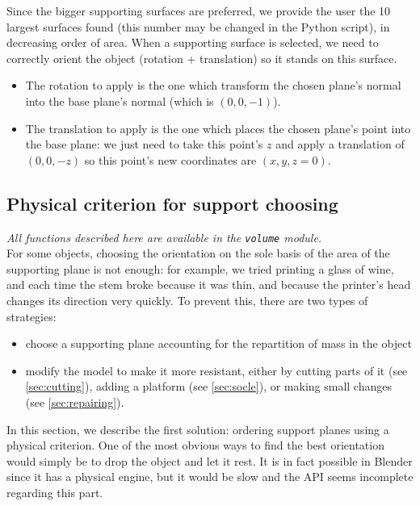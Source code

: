 \documentclass{report}
\begin{document}
Since the bigger supporting surfaces are preferred, we provide the user the 10 largest surfaces found (this number may be changed in the Python script), in decreasing order of area. When a supporting surface is selected, we need to correctly orient the object (rotation + translation) so it stands on this surface.

\begin{itemize}
\item The rotation to apply is the one which transform the chosen plane’s normal into the base plane’s normal (which is $(0, 0, -1)$).
\item The translation to apply is the one which places the chosen plane’s point into the base plane: we just need to take this point’s $z$ and apply a translation of $(0, 0, -z)$ so this point’s new coordinates are $(x, y, z=0)$.
\end{itemize}

\subsection{Physical criterion for support choosing}

	\emph{All functions described here are available in the \texttt{volume} module.}\\

	For some objects, choosing the orientation on the sole basis of the area of the supporting plane is not enough: for example, we tried printing a glass of wine, and each time the stem broke because it was thin, and because the printer's head changes its direction very quickly. To prevent this, there are two types of strategies:
	\begin{itemize}
		\item choose a supporting plane accounting for the repartition of mass in the object
		\item modify the model to make it more resistant, either by cutting parts of it (see \ref{sec:cutting}), adding a platform (see \ref{sec:socle}), or making small changes (see \ref{sec:repairing}).
	\end{itemize}

	In this section, we describe the first solution: ordering support planes using a physical criterion. One of the most obvious ways to find the best orientation would simply be to drop the object and let it rest. It is in fact possible in Blender since it has a physical engine, but it would be slow and the API seems incomplete regarding this part.
	
\end{document}
